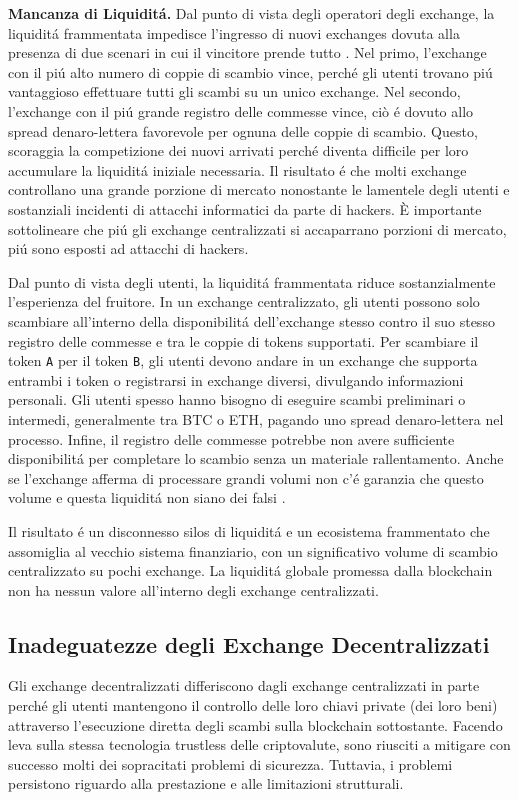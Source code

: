 \documentclass[UTF8,nofonts]{article}
\begin{document}
\begin{multicols}{2}
\textbf{Mancanza di Liquidit\'a.} Dal punto di vista degli operatori degli exchange, la liquidit\'a frammentata impedisce l'ingresso di nuovi exchanges dovuta alla presenza di due scenari in cui il vincitore prende tutto . Nel primo, l'exchange con il pi\'u alto numero di coppie di scambio vince, perch\'e gli utenti trovano pi\'u vantaggioso effettuare tutti gli scambi su un unico exchange. Nel secondo, l'exchange con il pi\'u grande registro delle commesse vince, ciò \'e dovuto allo spread denaro-lettera favorevole per ognuna delle coppie di scambio. Questo, scoraggia la competizione dei nuovi arrivati perch\'e diventa difficile per loro accumulare la liquidit\'a iniziale necessaria. Il risultato \'e che molti exchange controllano una grande porzione di mercato nonostante le lamentele degli utenti e sostanziali incidenti di attacchi informatici da parte di hackers. È importante sottolineare che pi\'u gli exchange centralizzati si accaparrano porzioni di mercato, pi\'u sono esposti ad attacchi di hackers.

Dal punto di vista degli utenti, la liquidit\'a frammentata riduce sostanzialmente l'esperienza del fruitore. In un exchange centralizzato, gli utenti possono solo scambiare all'interno della disponibilit\'a dell'exchange stesso contro il suo stesso registro delle commesse e tra le coppie di tokens supportati. Per scambiare il token \verb|A| per il token \verb|B|, gli utenti devono andare in un exchange che supporta entrambi i token o registrarsi in exchange diversi, divulgando informazioni personali. Gli utenti spesso hanno bisogno di eseguire scambi preliminari o intermedi, generalmente tra BTC o ETH, pagando uno spread denaro-lettera nel processo. Infine, il registro delle commesse potrebbe non avere sufficiente disponibilit\'a per completare lo scambio senza un materiale rallentamento. Anche se l'exchange afferma di processare grandi volumi non c'\'e garanzia che questo volume e questa liquidit\'a non siano dei falsi \cite{fakevolume}.

Il risultato \'e un disconnesso silos di liquidit\'a e un ecosistema frammentato che assomiglia al vecchio sistema finanziario, con un significativo volume di scambio centralizzato su pochi exchange. La liquidit\'a globale promessa dalla blockchain non ha nessun valore all'interno degli exchange centralizzati.

\subsection{Inadeguatezze degli Exchange Decentralizzati}
Gli exchange decentralizzati differiscono dagli exchange centralizzati in parte perch\'e gli utenti mantengono il controllo delle loro chiavi private (dei loro beni) attraverso l'esecuzione diretta degli scambi sulla blockchain sottostante. Facendo leva sulla stessa tecnologia trustless delle criptovalute, sono riusciti a  mitigare con successo molti dei sopracitati problemi di sicurezza. Tuttavia, i problemi persistono riguardo alla prestazione e alle limitazioni strutturali.


\end{multicols}
\end{document}
